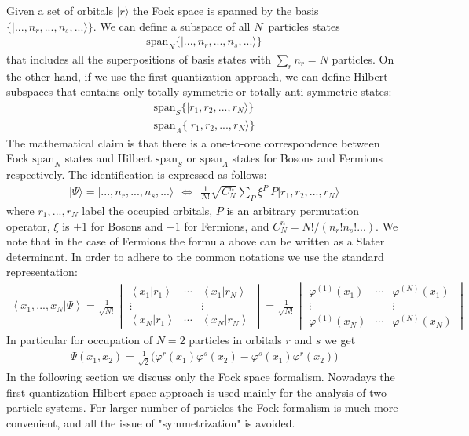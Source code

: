 \documentclass[onecolumn,fleqn]{revtex4}
\newcommand{\beq}{\begin{eqnarray}}
\newcommand{\eeq}{\end{eqnarray}}
\begin{document}
 
Given a set of orbitals $|r\rangle$ the Fock space is spanned 
by the basis ${ \{ |...,n_r,...,n_s,...\rangle \} }$. 
We can define a subspace of all $N$~particles states  
\beq    
\mbox{span}_N\{ |...,n_r,...,n_s,...\rangle  \}
\eeq
that includes all the superpositions of 
basis states with $\sum_r n_r=N$ particles.
On the other hand, if we use the first quantization approach,  
we can define Hilbert subspaces that contains 
only totally symmetric or totally anti-symmetric states:
\beq    
\mbox{span}_S\{ |r_1,r_2,...,r_N\rangle  \} 
\\ \nonumber
\mbox{span}_A\{ |r_1,r_2,...,r_N\rangle  \}
\eeq
The mathematical claim is that there is a one-to-one 
correspondence between Fock $\mbox{span}_N$ states    
and Hilbert $\mbox{span}_S$ or $\mbox{span}_A$ states 
for Bosons and Fermions respectively. 
The identification is expressed as follows:
\beq 
|\Psi\rangle = |...,n_r,...,n_s,...\rangle 
\ \ \Longleftrightarrow  \ \
\frac{1}{N!}\sqrt{C^n_N}\sum_P \xi^P \ P |r_1,r_2,...,r_N\rangle 
\eeq
where ${r_1,...,r_N}$ label the occupied orbitals, 
$P$ is an arbitrary permutation operator, 
$\xi$ is $+1$ for Bosons and $-1$ for Fermions, 
and ${C^n_N=N!/(n_r!n_s!...)}$.    
We note that in the case of Fermions the 
formula above can be written as a Slater determinant.
In order to adhere to the common notations 
we use the standard representation:  
\beq
\left\langle x_{1},...,x_{N}| \Psi \right\rangle 
= 
\frac{1}{\sqrt{N!}} 
\begin{vmatrix} 
\left\langle x_{1}|r_{1}\right\rangle  
& \cdots & \left\langle x_{1} |r_{N}\right\rangle \\ 
\vdots &  & \vdots\\ 
\left\langle x_{N}|r_{1}\right\rangle  
& \cdots & \left\langle x_{N} |r_{N}\right\rangle 
\end{vmatrix} 
= 
\frac{1}{\sqrt{N!}} 
\begin{vmatrix} 
\varphi^{(1)}(x_{1})  
& \cdots & \varphi^{(N)}(x_{1}) \\ 
\vdots &  & \vdots\\ 
\varphi^{(1)}(x_{N})  
& \cdots &  \varphi^{(N)}(x_{N})  
\end{vmatrix} 
\eeq
In particular for occupation of $N=2$ particles 
in orbitals $r$ and $s$ we get  
\beq
\Psi(x_1,x_2) = \frac{1}{\sqrt{2}}
\Big(\varphi^r(x_1)\varphi^s(x_2) -\varphi^s(x_1)\varphi^r(x_2)\Big)   
\eeq
In the following section we discuss only the Fock space formalism.
Nowadays the first quantization Hilbert space approach is used 
mainly for the analysis of two particle systems. For larger number 
of particles the Fock formalism is much more convenient, and all the 
issue of "symmetrization" is avoided.
\end{document}
